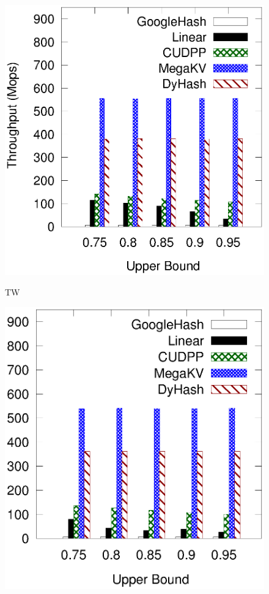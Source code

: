 \begin{figure}[t]
	\begin{minipage}{0.19\linewidth}\centering
		\includegraphics[width=\linewidth]{pic/static-upper/upper_search_twitter.eps}
		\centerline{TW}
	\end{minipage}
	\hfill
	\begin{minipage}{0.19\linewidth}\centering
		\includegraphics[width=\linewidth]{pic/static-upper/upper_search_reddit.eps}

\end{minipage}
\end{figure}
